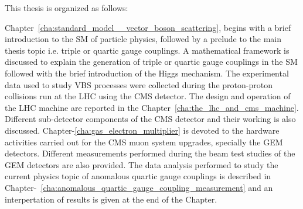 This thesis is organized as follows:

Chapter~\ref{cha:standard_model__vector_boson_scattering}, begins with a brief introduction to the SM of particle physics, followed by a prelude to the main thesis topic i.e. triple or quartic gauge couplings. A mathematical framework is discussed to explain the generation of triple or quartic gauge couplings in the SM followed with the brief introduction of the Higgs mechanism. The experimental data used to study VBS processes were collected during the proton-proton collisions run at the LHC using the CMS detector. The design and operation of the LHC machine are reported in the Chapter~\ref{cha:the_lhc_and_cms_machine}. Different sub-detector components of the CMS detector and their working is also discussed. Chapter-\ref{cha:gas_electron_multiplier} is devoted to the hardware activities carried out for the CMS muon system upgrades, specially the GEM detectors. Different measurements performed during the beam test studies of the GEM detectors are also provided. The data analysis performed to study the current physics topic of anomalous quartic gauge couplings is described in Chapter-~\ref{cha:anomalous_quartic_gauge_coupling_measurement} and an interpertation of results is given at the end of the Chapter.
